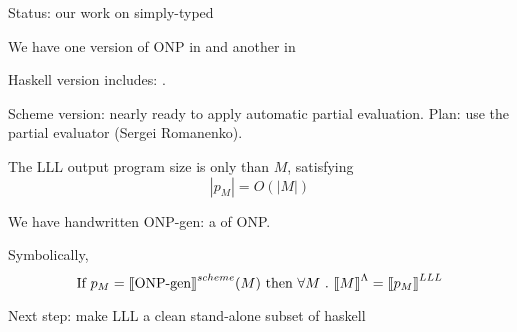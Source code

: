 \documentclass[12pt,fleqn,landscape]{article}
\begin{document}
\begin{slide}{Status: our work on simply-typed \lc }

\be

\item We have one version of ONP  in   and another in 
\vair

\item {\sc Haskell} version includes: .
\vair

\item {\sc Scheme} version: nearly ready to apply automatic partial evaluation. Plan: use  the  partial evaluator  (Sergei Romanenko).
\vair
\vair

\item The LLL output program size  is only  than $M$, satisfying 
$$|p_M| = O(|M|)$$


\item We have   handwritten ONP-gen: a   of ONP. 

Symbolically,
$$
\mbox{If\ }p_M = \mbox{$\lbrack\hspace{-0.3ex}\lbrack$} \mbox{ONP-gen} \mbox{$\rbrack\hspace{-0.3ex}\rbrack$}^{\sc scheme} (M)
\mbox{\ then\ }
\forall M \ .\ \mbox{$\lbrack\hspace{-0.3ex}\lbrack$} M\mbox{$\rbrack\hspace{-0.3ex}\rbrack$}^\Lambda =  \mbox{$\lbrack\hspace{-0.3ex}\lbrack$} p_M \mbox{$\rbrack\hspace{-0.3ex}\rbrack$}^{LLL} 
$$


\smallskip

\item Next step: make LLL a clean stand-alone  subset of {\sc haskell}
\ee

\end{slide}




\end{document}
